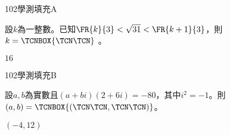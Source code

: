 \begin{QUESTIONS}
    \begin{QUESTION}
        \begin{ExamInfo}{102}{學測}{填充}{A}
        \end{ExamInfo}
        \begin{ExamAnsRateInfo}{68}{95}{82}{27}
        \end{ExamAnsRateInfo}
        \begin{QBODY}
            設$k$為一整數。已知$\FR{k}{3}<\sqrt{31}<\FR{k+1}{3}$，則$k= \TCNBOX{\TCN\TCN}$        。
        \end{QBODY}
        \begin{QFROMS}
        \end{QFROMS}
        \begin{QTAGS}\end{QTAGS}
        \begin{QANS}
            $16$
        \end{QANS}
        \begin{QSOLLIST}
        \end{QSOLLIST}
        \begin{QEMPTYSPACE}
        \end{QEMPTYSPACE}
    \end{QUESTION}
    \begin{QUESTION}
        \begin{ExamInfo}{102}{學測}{填充}{B}
        \end{ExamInfo}
        \begin{ExamAnsRateInfo}{59}{97}{71}{9}
        \end{ExamAnsRateInfo}
        \begin{QBODY}
            設$a,b$為實數且$(a+bi)(2+6i)=-80$，其中${{i}^{2}}=-1$。則$(a,b)=\TCNBOX{(\TCN\TCN,\TCN\TCN)}$。
        \end{QBODY}
        \begin{QFROMS}
        \end{QFROMS}
        \begin{QTAGS}\end{QTAGS}
        \begin{QANS}
            $(-4,12)$
        \end{QANS}
        \begin{QSOLLIST}
        \end{QSOLLIST}
        \begin{QEMPTYSPACE}

\end{QEMPTYSPACE}
\end{QUESTION}
\end{QUESTIONS}

